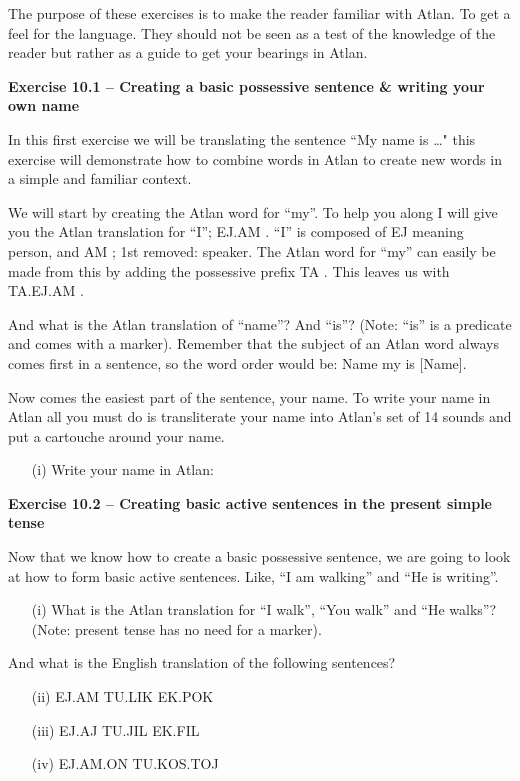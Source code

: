 

The purpose of these exercises is to make the reader familiar with Atlan. To get a feel for the language. They should not be seen as a test of the knowledge of the reader but rather as a guide to get your bearings in Atlan.  


\noindent \textbf{Exercise 10.1 -- Creating a basic possessive sentence \& writing your own name} 

In this first exercise we will be translating the sentence “My name is …" this exercise will demonstrate how to combine words in Atlan to create new words in a simple and familiar context. 

We will start by creating the Atlan word for “my”. To help you along I will give you the Atlan translation for “I”; EJ.AM \ej\am. “I” is composed of EJ \ej meaning person, and AM \am; 1st removed: speaker. The Atlan word for “my” can easily be made from this by adding the possessive prefix TA \ta. This leaves us with TA.EJ.AM \ta\ej\am.  

And what is the Atlan translation of “name”? And “is”? (Note: “is” is a predicate and comes with a marker). Remember that the subject of an Atlan word always comes first in a sentence, so the word order would be: Name my is [Name]. 

Now comes the easiest part of the sentence, your name. To write your name in Atlan all you must do is transliterate your name into Atlan’s set of 14 sounds and put a cartouche around your name. %
\begin{itemize}
	\item[(i)] Write your name in Atlan:
	\vspace{0.3cm}
	\dotfill
\end{itemize}

\noindent \textbf{Exercise 10.2 -- Creating basic active sentences in the present simple tense} 

Now that we know how to create a basic possessive sentence, we are going to look at how to form basic active sentences. Like, “I am walking” and “He is writing”.  
\begin{itemize}
\item[(i)] What is the Atlan translation for “I walk”, “You walk” and “He walks”? (Note: present tense has no need for a marker).  
\end{itemize}

\noindent And what is the English translation of the following sentences? 
\begin{itemize}
    \item[(ii)] EJ.AM TU.LIK EK.POK \ej\am \tu\lik \ek\pok  

    \item[(iii)] EJ.AJ TU.JIL EK.FIL\ej\aj \tu\jil \ek\fil  

    \item[(iv)] EJ.AM.ON TU.KOS.TOJ \ej\am\on \tu\kos\toj 
\end{itemize}

